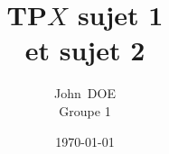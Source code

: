 


\newcommand{\firstName}{John}
\newcommand{\lastName}{DOE}
\newcommand{\groupNumber}{1}
\newcommand{\university}{My university}

\makeatletter
{}
\makeatother

\universityLogo






\setcounter{tocdepth}{2}





  \titlehead{{\Large Matière} \hfill 1ère Année - 2022/2023}
  \title{TP$X$ sujet 1 \\ et sujet 2}
  \author{\firstName\ \lastName\\Groupe \groupNumber}
  \date{\today}
  \publishers{\university}

  \maketitle

  \noindent\makebox[\linewidth]{\rule{7.5cm}{0.4pt}}

  \tableofcontents
  \newpage




